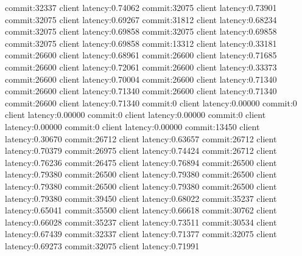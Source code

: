 commit:32337 client latency:0.74062
commit:32075 client latency:0.73901
commit:32075 client latency:0.69267
commit:31812 client latency:0.68234
commit:32075 client latency:0.69858
commit:32075 client latency:0.69858
commit:32075 client latency:0.69858
commit:13312 client latency:0.33181
commit:26600 client latency:0.68961
commit:26600 client latency:0.71685
commit:26600 client latency:0.72061
commit:26600 client latency:0.33373
commit:26600 client latency:0.70004
commit:26600 client latency:0.71340
commit:26600 client latency:0.71340
commit:26600 client latency:0.71340
commit:26600 client latency:0.71340
commit:0 client latency:0.00000
commit:0 client latency:0.00000
commit:0 client latency:0.00000
commit:0 client latency:0.00000
commit:0 client latency:0.00000
commit:13450 client latency:0.30670
commit:26712 client latency:0.63657
commit:26712 client latency:0.70379
commit:26975 client latency:0.74424
commit:26712 client latency:0.76236
commit:26475 client latency:0.76894
commit:26500 client latency:0.79380
commit:26500 client latency:0.79380
commit:26500 client latency:0.79380
commit:26500 client latency:0.79380
commit:26500 client latency:0.79380
commit:39450 client latency:0.68022
commit:35237 client latency:0.65041
commit:35500 client latency:0.66618
commit:30762 client latency:0.66028
commit:35237 client latency:0.73511
commit:30534 client latency:0.67439
commit:32337 client latency:0.71377
commit:32075 client latency:0.69273
commit:32075 client latency:0.71991
